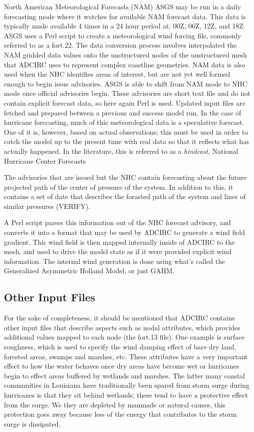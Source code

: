 \documentclass{article}
\begin{document}
North American Meteorological Forecasts (NAM) ASGS may be run in a daily
forecasting mode where it watches for available NAM forecast data. This data is
typically made available 4 times in a 24 hour period at: 00Z, 06Z, 12Z, and 18Z.
ASGS uses a Perl script to create a meteorological wind forcing file, commonly
referred to as a fort.22. The data conversion process involves interpolated the
NAM gridded data values onto the unstructured nodes of the unstructured mesh
that ADCIRC uses to represent complex coastline geometries.  NAM data is also
used when the NHC identifies areas of interest, but are not yet well formed
enough to begin issue advisories. ASGS is able to shift from NAM mode to NHC
mode once official advisories begin. These advisories are short text file and do
not contain explicit forecast data, so here again Perl is used.  Updated input
files are fetched and prepared between a previous and success model run. In the
case of hurricane forecasting, much of this meteorological data is a speculative
forecast. One of it is, however, based on actual observations; this must be used
in order to catch the model up to the present time with real data so that it
reflects what has actually happened. In the literature, this is referred to as a
\textit{hindcast}.  National Hurricane Center Forecasts

The advisories that are issued but the NHC contain forecasting about the future
projected path of the center of pressure of the system. In addition to this, it
contains a set of date that describes the forasted path of the system and lines
of similar pressures (VERIFY).

A Perl script parses this information out of the NHC forecast advisory, and
converts it into a format that may be used by ADCIRC to generate a wind field
gradient. This wind field is then mapped internally inside of ADCIRC to the
mesh, and used to drive the model state as if it were provided explicit wind
information. The internal wind generation is done using what’s called the
Generalized Asymmetric Holland Model, or just GAHM.

\subsection{Other Input Files}

For the sake of completeness, it should be mentioned that ADCIRC contains other
input files that describe aspects such as nodal attributes, which provides
additional values mapped to each node (the fort.13 file). One example is surface
roughness, which is used to specify the wind damping effect of bare dry land,
forested areas, swamps and marshes, etc. These attributes have a very important
effect to how the water behaves once dry areas have become wet or hurricanes
begin to effect areas buffered by wetlands and marshes. The latter many coastal
communities in Louisiana have traditionally been spared from storm surge during
hurricanes is that they sit behind wetlands; these tend to have a protective
effect from the surge. We they are depleted by manmade or natural causes, this
protection goes away because less of the energy that contributes to the storm
surge is dissipated.
\end{document}
